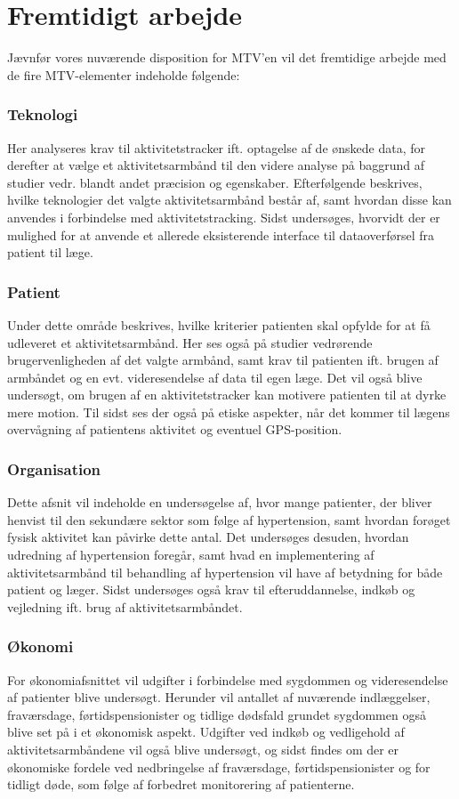 \section{Fremtidigt arbejde}

Jævnfør vores nuværende disposition for MTV'en vil det fremtidige arbejde med de fire MTV-elementer indeholde følgende: 

\subsubsection{Teknologi}
Her analyseres krav til aktivitetstracker ift. optagelse af de ønskede data, for derefter at vælge et aktivitetsarmbånd til den videre analyse på baggrund af studier vedr. blandt andet præcision og egenskaber. Efterfølgende beskrives, hvilke teknologier det valgte aktivitetsarmbånd består af, samt hvordan disse kan anvendes i forbindelse med aktivitetstracking. Sidst undersøges, hvorvidt der er mulighed for at anvende et allerede eksisterende interface til dataoverførsel fra patient til læge.

\subsubsection{Patient}
Under dette område beskrives, hvilke kriterier patienten skal opfylde for at få udleveret et aktivitetsarmbånd. Her ses også på studier vedrørende brugervenligheden af det valgte armbånd, samt krav til patienten ift. brugen af armbåndet og en evt. videresendelse af data til egen læge. Det vil også blive undersøgt, om brugen af en aktivitetstracker kan motivere patienten til at dyrke mere motion. Til sidst ses der også på etiske aspekter, når det kommer til lægens overvågning af patientens aktivitet og eventuel GPS-position.

\subsubsection{Organisation}
Dette afsnit vil indeholde en undersøgelse af, hvor mange patienter, der bliver henvist til den sekundære sektor som følge af hypertension, samt hvordan forøget fysisk aktivitet kan påvirke dette antal. Det undersøges desuden, hvordan udredning af hypertension foregår, samt hvad en implementering af aktivitetsarmbånd til behandling af hypertension vil have af betydning for både patient og læger. Sidst undersøges også krav til efteruddannelse, indkøb og vejledning ift. brug af aktivitetsarmbåndet.

\subsubsection{Økonomi}
For økonomiafsnittet vil udgifter i forbindelse med sygdommen og videresendelse af patienter blive undersøgt. Herunder vil antallet af nuværende indlæggelser, fraværsdage, førtidspensionister og tidlige dødsfald grundet sygdommen også blive set på i et økonomisk aspekt. Udgifter ved indkøb og vedligehold af aktivitetsarmbåndene vil også blive undersøgt, og sidst findes om der er økonomiske fordele ved nedbringelse af fraværsdage, førtidspensionister og for tidligt døde, som følge af forbedret monitorering af patienterne. 